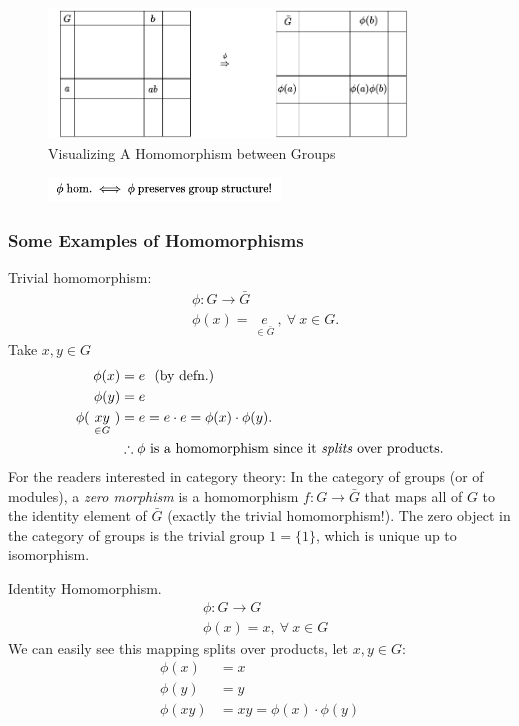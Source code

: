 \begin{figure}[ht!]
    \centering
    \includegraphics[width=0.85\textwidth]{Figures/homomorphisms_2 (1).pdf}
    \caption{Visualizing A Homomorphism between Groups}
    \label{fig:morphism2fig}
\end{figure}

\begin{figure}[h!]
    \centering
    \includegraphics[width=0.55\textwidth]{Figures/homomorphisms_3 (1).pdf}
    \label{fig:morphism3fig}
\end{figure}
\newpage
\subsubsection{Some Examples of Homomorphisms}
\begin{example}
Trivial homomorphism:
\begin{align}
    &\phi: G\rightarrow \bar{G} \nonumber \\
    &\phi(x)=\ \underset{\in \bar{G}}{e} \ , \ \forall \ x\in G. \nonumber
\end{align}
Take $x,y\in G$
\begin{align}
    \phi(x)&=e \ \ (\text{by defn.}) \nonumber\\
    \phi(y)&=e \ \nonumber \\
    \phi(\ \underset{\in G}{xy}\ )&=e=e\cdot e =\phi(x)\cdot \phi(y). \nonumber\\
    &\therefore \phi \text{ is a homomorphism since it \textit{splits} over products.} \nonumber 
\end{align}
For the readers interested in category theory: In the category of groups (or of modules), a \textit{zero morphism} is a homomorphism $f : G \rightarrow \bar{G}$ that maps all of $G$ to the identity element of $\bar{G}$ (exactly the trivial homomorphism!). The zero object in the category of groups is the trivial group $1 = \{1\}$, which is unique up to isomorphism.
\end{example}
\begin{example}
Identity Homomorphism.
\begin{align}
    &\phi: G\rightarrow G \nonumber \\
    &\phi(x)=x, \ \forall \ x\in G \nonumber 
\end{align}
We can easily see this mapping splits over products, let $x,y\in G$:
\begin{align}
    \phi(x)&=x \nonumber \\
    \phi(y)&=y \nonumber \\
    \phi(xy)&=xy=\phi(x)\cdot \phi(y) \nonumber 
\end{align}
\end{example}

